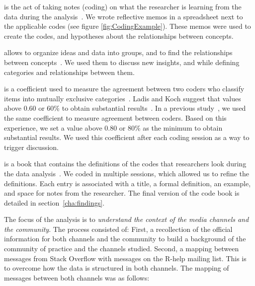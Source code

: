 	\begin{description}[itemsep=3pt, topsep=2pt, leftmargin=3em, parsep=0pt]
		\item[Memoing] is the act of taking notes (coding) on what the researcher is learning from the data during the analysis~\cite{Groenewald2008}.
        We wrote reflective memos in a spreadsheet next to the applicable codes (see figure \ref{fig:CodingExample}).
        These memos were used to create the codes, and hypotheses about the relationships between concepts.

		\item[Affinity diagrams] allows to organize ideas and data into groups, and to find the relationships between concepts~\cite{Scupin1997}.
		We used them to discuss new insights, and while defining categories and relationships between them.

		\item[Inter-rater agreement \textit{Cohen Kappa}] is a coefficient used to measure the agreement between two coders who classify items into mutually exclusive categories~\cite{Stemler2004}.
		Ladis and Koch suggest that values above 0.60 or 60\% to obtain substantial results~\cite{Landis1977}.
		In a previous study~\cite{Gomez2013}, we used the same coefficient to measure agreement between coders.
		Based on this experience, we set a value above 0.80 or 80\% as the minimum to obtain substantial results.
		We used this coefficient after each coding session as a way to trigger discussion.

		\item[Code book] is a book that contains the definitions of the codes that researchers look during the data analysis~\cite{MacQueen1998}.
		We coded in multiple sessions, which allowed us to refine the definitions.
		Each entry is associated with a title, a formal definition, an example, and space for notes from the researcher.
		The final version of the code book is detailed in section~\ref{cha:findings}.
	\end{description}

	The focus of the analysis is to \textit{understand the context of the media channels and the community}.
	The process consisted of:
	First, a recollection of the official information for both channels and the community to build a background of the community of practice and the channels studied.
	Second, a mapping between messages from Stack Overflow with messages on the R-help mailing list.
    This is to overcome how the data is structured in both channels.
    The mapping of messages between both channels was as follows:


